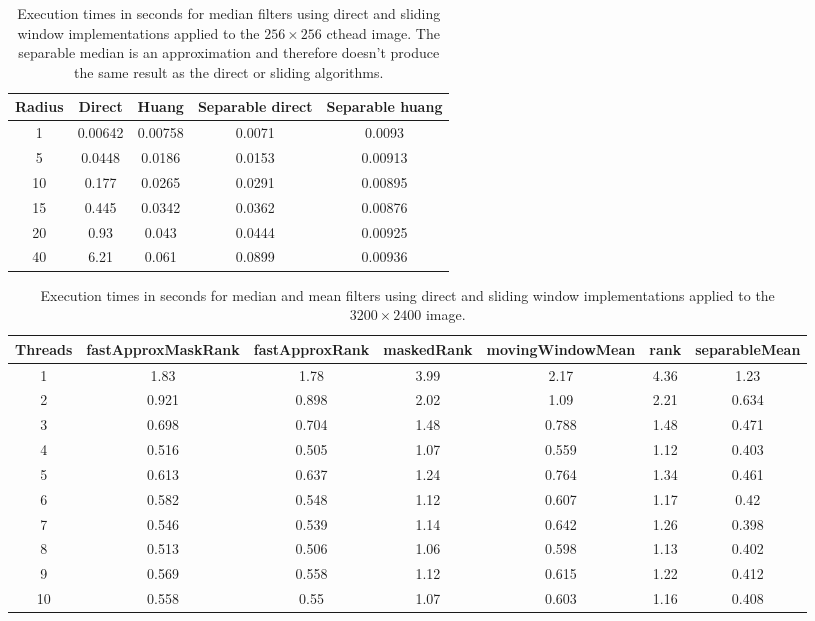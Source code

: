 \documentclass{InsightArticle}
\begin{document}
\begin{table}[phtb]
\centering
\small
\begin{tabular}{ccccc}
\hline
Radius	&	Direct	&	Huang	&	Separable direct	&	Separable huang	\\
\hline
1	&	0.00642	&	0.00758	&	0.0071	&	0.0093	\\
5	&	0.0448	&	0.0186	&	0.0153	&	0.00913	\\
10	&	0.177	&	0.0265	&	0.0291	&	0.00895	\\
15	&	0.445	&	0.0342	&	0.0362	&	0.00876	\\
20	&	0.93	&	0.043	&	0.0444	&	0.00925	\\
40	&	6.21	&	0.061	&	0.0899	&	0.00936	\\
\hline
\hline
\end{tabular}
\caption{Execution times in seconds for median filters using direct and sliding window implementations applied to the $256 \times 256$ cthead image. The separable median is an approximation and therefore doesn't produce the same result as the direct or sliding algorithms.\label{tab:perfRankMedian}}
\end{table}


\begin{table}[phtb]
\centering
\small
\begin{tabular}{ccccccc}
\hline
Threads	&	fastApproxMaskRank	&	fastApproxRank	&	maskedRank	&	movingWindowMean	&	rank	&	separableMean	\\
\hline
1	&	1.83	&	1.78	&	3.99	&	2.17	&	4.36	&	1.23	\\
2	&	0.921	&	0.898	&	2.02	&	1.09	&	2.21	&	0.634	\\
3	&	0.698	&	0.704	&	1.48	&	0.788	&	1.48	&	0.471	\\
4	&	0.516	&	0.505	&	1.07	&	0.559	&	1.12	&	0.403	\\
5	&	0.613	&	0.637	&	1.24	&	0.764	&	1.34	&	0.461	\\
6	&	0.582	&	0.548	&	1.12	&	0.607	&	1.17	&	0.42	\\
7	&	0.546	&	0.539	&	1.14	&	0.642	&	1.26	&	0.398	\\
8	&	0.513	&	0.506	&	1.06	&	0.598	&	1.13	&	0.402	\\
9	&	0.569	&	0.558	&	1.12	&	0.615	&	1.22	&	0.412	\\
10	&	0.558	&	0.55	&	1.07	&	0.603	&	1.16	&	0.408	\\
\hline
\hline
\end{tabular}
\caption{Execution times in seconds for median and mean filters using direct and sliding window implementations applied to the $3200 \times 2400$ image.\label{tab:perfRankThreads}}
\end{table}
\end{document}
